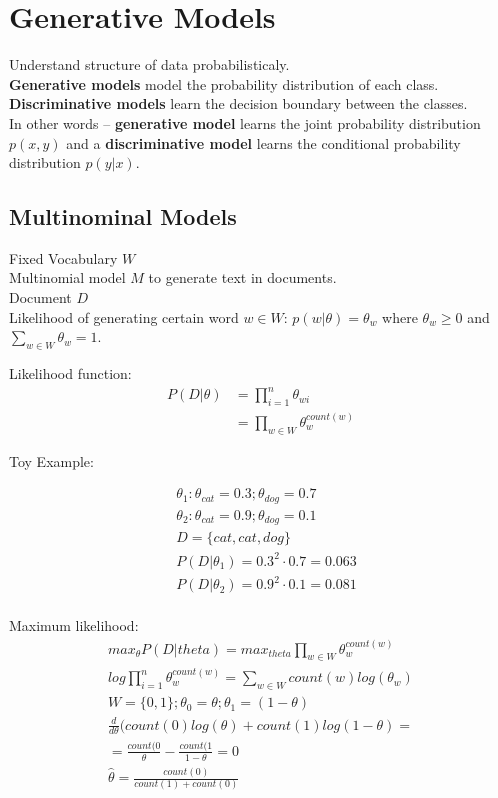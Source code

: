 \section{Generative Models}
Understand structure of data probabilisticaly.\\
\textbf{Generative models} model the probability distribution of each class.
\textbf{Discriminative models} learn the decision boundary between the classes.\\
In other words --  \textbf{generative model} learns the joint probability distribution $p(x,y)$ 
and a \textbf{discriminative model} learns the conditional probability distribution $p(y|x)$.

\subsection{Multinominal Models}

Fixed Vocabulary $W$\\

Multinomial model $M$ to generate text in documents.\\

Document $D$\\

Likelihood of generating certain word $w \in W$: $p(w|\theta)=\theta_w$ where $\theta_w \geq 0$ and $\sum _{w\in W} \theta _ w = 1$.

Likelihood function:\\

\begin{align*}
P(D|\theta) &= \prod_{i=1}^n \theta_{wi}\\
&= \prod_{w \in W} \theta_w^{count(w)}
\end{align*}

Toy Example:

\begin{align*}
&\theta_1: \theta_{cat}=0.3; \theta_{dog}=0.7\\
&\theta_2: \theta_{cat}=0.9; \theta_{dog}=0.1\\
&D = \{cat,cat,dog\}\\
&P(D|\theta_1)= 0.3^2 \cdot 0.7 = 0.063\\
&P(D|\theta_2)= 0.9^2 \cdot 0.1 = 0.081\\
\end{align*}

Maximum likelihood:\\
\begin{align*}
max_{\theta}P(D|theta) = max_{theta} \prod_{w \in W} \theta_w^{count(w)}\\
log \prod_{i=1}^n \theta_w^{count(w)} = \sum_{w \in W} count(w) log(\theta_w)\\
W=\{0,1\}; \theta_0=\theta; \theta_1=(1-\theta)\\
\frac{d}{d \theta}(count(0) log(\theta) + count(1)log(1-\theta) =\\
= \frac{count(0}{\theta} - \frac{count(1}{1-\theta} = 0\\
\hat{\theta}=\frac{count(0)}{count(1)+count(0)}
\end{align*}

